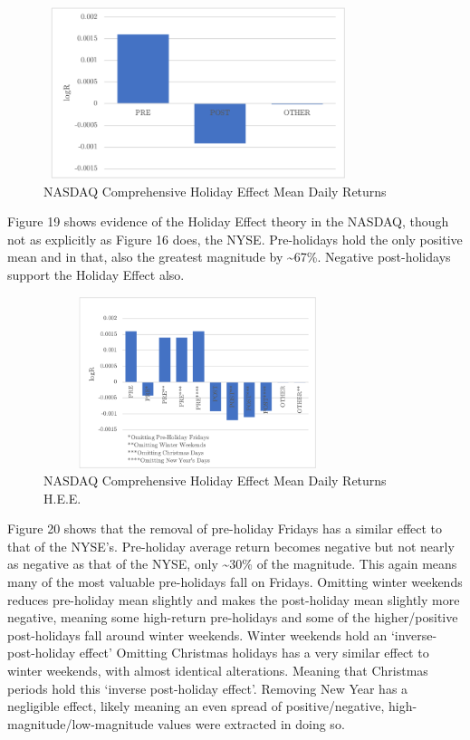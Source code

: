 \documentclass[11pt, english]{article}
\begin{document}
	\begin{figure}[H]
        \begin{center}
                \includegraphics[width=9cm,height=5cm]{NAS-HE1.png} 
                \caption{NASDAQ Comprehensive Holiday Effect Mean Daily Returns}
        \end{center}
        \end{figure}

	Figure 19 shows evidence of the Holiday Effect theory in the NASDAQ, though not as explicitly as Figure 16 does, the NYSE. Pre-holidays hold the only positive mean and in that, also the greatest magnitude by \~{}67\%. Negative post-holidays support the Holiday Effect also.

	\begin{figure}[H]
        \begin{center}
                \includegraphics[width=9cm,height=5cm]{NAS-HE2.png}              
                \caption{NASDAQ Comprehensive Holiday Effect Mean Daily Returns H.E.E.} 
        \end{center}
        \end{figure}

	Figure 20 shows that the removal of pre-holiday Fridays has a similar effect to that of the NYSE’s. Pre-holiday average return becomes negative but not nearly as negative as that of the NYSE, only \~{}30\% of the magnitude. This again means many of the most valuable pre-holidays fall on Fridays. Omitting winter weekends reduces pre-holiday mean slightly and makes the post-holiday mean slightly more negative, meaning some high-return pre-holidays and some of the higher/positive post-holidays fall around winter weekends. Winter weekends hold an `inverse- post-holiday effect’ Omitting Christmas holidays has a very similar effect to winter weekends, with almost identical alterations. Meaning that Christmas periods hold this `inverse post-holiday effect'. Removing New Year has a negligible effect, likely meaning an even spread of positive/negative, high-magnitude/low-magnitude values were extracted in doing so.
\end{document}
